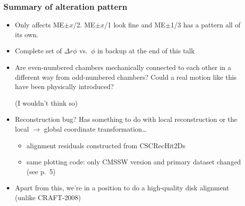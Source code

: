 \documentclass[compress]{beamer}
\begin{document}
\begin{frame}
\frametitle{Summary of alteration pattern}

\begin{itemize}\setlength{\itemsep}{0.25 cm}
\item Only affects ME$\pm x$/2.  ME$\pm x$/1 look fine and ME$\pm$1/3
  has a pattern all of its own.
\item Complete set of $\Delta r\phi$ vs.~$\phi$ in backup at the end of this talk
\item Are even-numbered chambers mechanically connected to each other
  in a different way from odd-numbered chambers?  Could a real motion
  like this have been physically introduced?

(I wouldn't think so)
\item Reconstruction bug?  Has something to do with local
  reconstruction or the local $\to$ global coordinate transformation\ldots
\begin{itemize}
\item alignment residuals constructed from CSCRecHit2Ds
\item same plotting code: only CMSSW version and primary dataset changed (see p.~5)
\end{itemize}

\item Apart from this, we're in a position to do a high-quality disk alignment
(unlike CRAFT-2008)
\end{itemize}
\end{frame}
\end{document}
